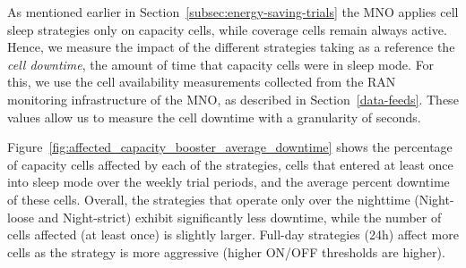 As mentioned earlier in Section~\ref{subsec:energy-saving-trials} the MNO applies cell sleep strategies only on capacity cells, while coverage cells remain always active. Hence, we measure the impact of the different strategies taking as a reference the \textit{cell downtime}, \ie the amount of time that capacity cells were in sleep mode. For this, we use the cell availability measurements collected from the RAN monitoring infrastructure of the MNO, as described in Section~\ref{data-feeds}. These values allow us to measure the cell downtime with a granularity of seconds.



Figure~\ref{fig:affected_capacity_booster_average_downtime} shows the percentage of capacity cells affected by each of the strategies, \ie cells that entered at least once into sleep mode over the weekly trial periods, and the average percent downtime of these cells. Overall, the strategies that operate only over the nighttime (Night-loose and Night-strict) exhibit significantly less downtime, while the number of cells affected (at least once) is slightly larger. Full-day strategies (24h) affect more cells as the strategy is more aggressive (\ie higher ON/OFF thresholds are higher).


